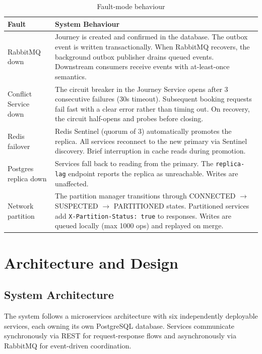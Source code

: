 \documentclass[12pt,a4paper]{article}
\begin{document}
\begin{table}[H]
\centering\small
\caption{Fault-mode behaviour}
\begin{tabularx}{\textwidth}{L{3cm} X}
  \toprule
  \textbf{Fault} & \textbf{System Behaviour} \\
  \midrule
  RabbitMQ down & Journey is created and confirmed in the database. The outbox event is written transactionally. When RabbitMQ recovers, the background outbox publisher drains queued events. Downstream consumers receive events with at-least-once semantics. \\
  \addlinespace
  Conflict Service down & The circuit breaker in the Journey Service opens after 3 consecutive failures (30s timeout). Subsequent booking requests fail fast with a clear error rather than timing out. On recovery, the circuit half-opens and probes before closing. \\
  \addlinespace
  Redis failover & Redis Sentinel (quorum of 3) automatically promotes the replica. All services reconnect to the new primary via Sentinel discovery. Brief interruption in cache reads during promotion. \\
  \addlinespace
  Postgres replica down & Services fall back to reading from the primary. The \texttt{replica-lag} endpoint reports the replica as unreachable. Writes are unaffected. \\
  \addlinespace
  Network partition & The partition manager transitions through CONNECTED $\to$ SUSPECTED $\to$ PARTITIONED states. Partitioned services add \texttt{X-Partition-Status: true} to responses. Writes are queued locally (max 1000 ops) and replayed on merge. \\
  \bottomrule
\end{tabularx}
\end{table}

\section{Architecture and Design}

\subsection{System Architecture}

The system follows a microservices architecture with six independently deployable services, each owning its own PostgreSQL database. Services communicate synchronously via REST for request-response flows and asynchronously via RabbitMQ for event-driven coordination.
\end{document}
